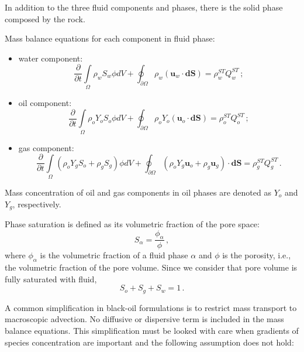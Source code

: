 \documentclass[authoryear,preprint,review,12pt]{elsarticle}
\begin{document}
In addition to the three fluid components and phases, there is the solid phase composed by the rock.

Mass balance equations for each component in fluid phase:

\begin{itemize}
\item water component:
\begin{equation}\label{eq: Sw1}
\frac{\partial}{\partial t} \int\limits_{\Omega} \rho_w S_w \phi dV + \oint_{\partial \Omega} \rho_w \left( \mathbf{u}_w \cdot \mathbf{dS} \right) = \rho_w^{ST}Q_w^{ST} \, ;
\end{equation}

\item oil component:
\begin{equation}\label{eq: So1}
\frac{\partial}{\partial t} \int\limits_{\Omega} \rho_o Y_o S_o \phi dV + \oint_{\partial \Omega} \rho_o Y_o \left(\mathbf{u}_o \cdot \mathbf{dS} \right)= \rho_o^{ST}Q_o^{ST} \, ;
\end{equation}

\item gas component:
\begin{equation}\label{eq: Sg1}
\frac{\partial}{\partial t} \int\limits_{\Omega} \left( \rho_o Y_g S_o + \rho_g S_g\right) \phi dV + \oint_{\partial \Omega} \left( \rho_o Y_g \mathbf{u}_o + \rho_g \mathbf{u}_g\right) \cdot \mathbf{dS}= \rho_g^{ST}Q_g^{ST} \, .
\end{equation}
\end{itemize}
Mass concentration of oil and gas components in oil phases are denoted as $Y_o$ and $Y_g$, respectively.

Phase saturation is defined as its volumetric fraction of the pore space:
\begin{equation}
S_\alpha = \frac{\phi_\alpha}{\phi} \, ,
\end{equation}
where $\phi_\alpha$ is the volumetric fraction of a fluid phase $\alpha$ and $\phi$ is the porosity, i.e., the volumetric fraction of the pore volume. Since we consider that pore volume is fully saturated with fluid,
\begin{equation}
S_o + S_g +S_w = 1 \, .
\end{equation}

A common simplification in black-oil formulations is to restrict mass transport to macroscopic advection. No diffusive or dispersive term is included in the mass balance equations. This simplification must be looked with care when gradients of species concentration are important and the following assumption does not hold:
\end{document}
